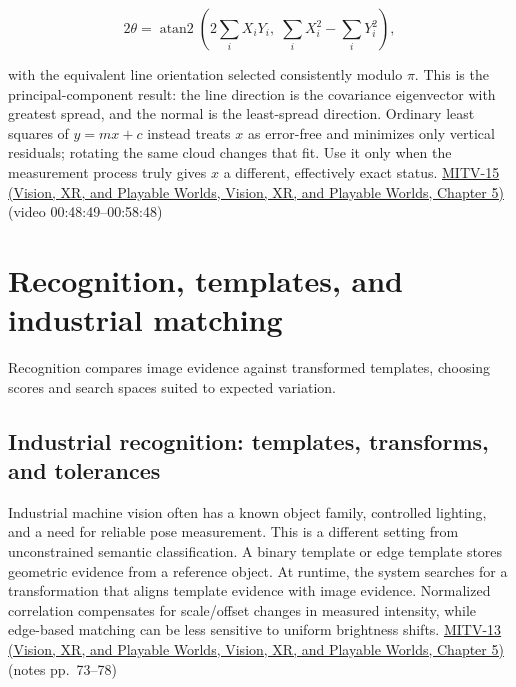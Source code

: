 \[
2\theta=\operatorname{atan2}\left(2\sum_iX_iY_i,\;\sum_iX_i^2-\sum_iY_i^2\right),
\]

with the equivalent line orientation selected consistently modulo \(\pi\). This is the principal-component result: the line direction is the covariance eigenvector with greatest spread, and the normal is the least-spread direction. Ordinary least squares of \(y=mx+c\) instead treats \(x\) as error-free and minimizes only vertical residuals; rotating the same cloud changes that fit. Use it only when the measurement process truly gives \(x\) a different, effectively exact status. \href{../07-Vision-XR-and-Playable-Worlds/main.pdf\#nameddest=04-visual-computing-ii-ch036-mitv-15---alignment-patmax-distance-field-filtering-and-sub-sampling-us-7065262}{MITV-15 (Vision, XR, and Playable Worlds, Vision, XR, and Playable Worlds, Chapter 5)} (video 00:48:49--00:58:48)

\section{Recognition, templates, and industrial matching}\label{04-visual-computing-ii-ch030-recognition-templates-and-industrial-matching}

Recognition compares image evidence against transformed templates, choosing scores and search spaces suited to expected variation.

\subsection{Industrial recognition: templates, transforms, and tolerances}\label{04-visual-computing-ii-ch030-industrial-recognition-templates-transforms-and-tolerances}

Industrial machine vision often has a known object family, controlled lighting, and a need for reliable pose measurement. This is a different setting from unconstrained semantic classification. A binary template or edge template stores geometric evidence from a reference object. At runtime, the system searches for a transformation that aligns template evidence with image evidence. Normalized correlation compensates for scale/offset changes in measured intensity, while edge-based matching can be less sensitive to uniform brightness shifts. \href{../07-Vision-XR-and-Playable-Worlds/main.pdf\#nameddest=04-visual-computing-ii-ch036-mitv-13---object-detection-recognition-and-pose-determination-patquick-us-7016539}{MITV-13 (Vision, XR, and Playable Worlds, Vision, XR, and Playable Worlds, Chapter 5)} (notes pp.~73--78)

